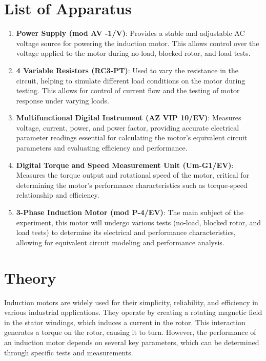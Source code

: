 \documentclass[12pt,a4paper]{report}
\begin{document}
\section{List of Apparatus}
\begin{enumerate}
    \item \textbf{Power Supply (mod AV -1/V)}: Provides a stable and adjustable AC voltage source for powering the induction motor. This allows control over the voltage applied to the motor during no-load, blocked rotor, and load tests.
    
    \item \textbf{4 Variable Resistors (RC3-PT)}: Used to vary the resistance in the circuit, helping to simulate different load conditions on the motor during testing. This allows for control of current flow and the testing of motor response under varying loads.
    
    \item \textbf{Multifunctional Digital Instrument (AZ VIP 10/EV)}: Measures voltage, current, power, and power factor, providing accurate electrical parameter readings essential for calculating the motor’s equivalent circuit parameters and evaluating efficiency and performance.
    
    \item \textbf{Digital Torque and Speed Measurement Unit (Um-G1/EV)}: Measures the torque output and rotational speed of the motor, critical for determining the motor’s performance characteristics such as torque-speed relationship and efficiency.
    
    \item \textbf{3-Phase Induction Motor (mod P-4/EV)}: The main subject of the experiment, this motor will undergo various tests (no-load, blocked rotor, and load tests) to determine its electrical and performance characteristics, allowing for equivalent circuit modeling and performance analysis.
\end{enumerate}

\section{Theory}
Induction motors are widely used for their simplicity, reliability, and efficiency in various industrial applications. They operate by creating a rotating magnetic field in the stator windings, which induces a current in the rotor. This interaction generates a torque on the rotor, causing it to turn. However, the performance of an induction motor depends on several key parameters, which can be determined through specific tests and measurements.
\end{document}
